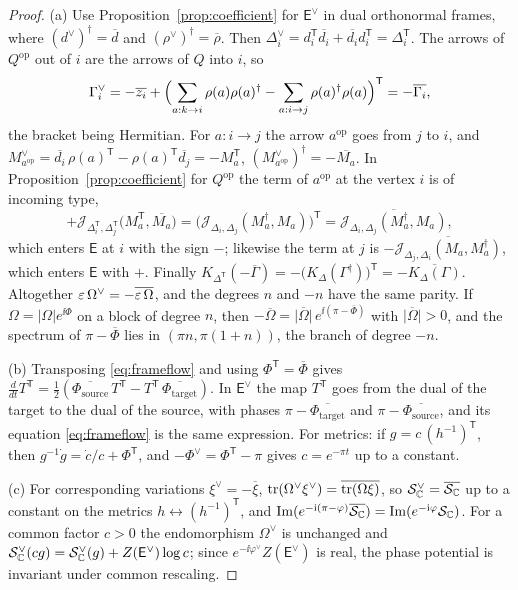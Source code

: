 \begin{proof}
(a) Use Proposition~\ref{prop:coefficient} for $\mathsf E^\vee$ in dual
orthonormal frames, where $(d^\vee)^\dagger=\overline d$ and
$(\rho^\vee)^\dagger=\overline\rho$. Then
$\Delta_i^\vee=d_i^{\mathsf T}\overline{d_i}+\overline{d_i}d_i^{\mathsf T}=\Delta_i^{\mathsf T}$. The arrows
of $Q^{\mathrm{op}}$ out of $i$ are the arrows of $Q$ into $i$, so
\[
 \Gamma_i^\vee=-\overline{z_i}+\Bigl(\sum_{a:k\to i}\rho(a)\rho(a)^\dagger
 -\sum_{a:i\to j}\rho(a)^\dagger\rho(a)\Bigr)^{\mathsf T}=-\overline{\Gamma_i},
\]
the bracket being Hermitian. For $a:i\to j$ the arrow $a^{\mathrm{op}}$ goes
from $j$ to $i$, and
$M^\vee_{a^{\mathrm{op}}}=\overline{d_i}\,\rho(a)^{\mathsf T}-\rho(a)^{\mathsf T}\overline{d_j}=-M_a^{\mathsf T}$,
$(M^\vee_{a^{\mathrm{op}}})^\dagger=-\overline{M_a}$. In
Proposition~\ref{prop:coefficient} for $Q^{\mathrm{op}}$ the term of
$a^{\mathrm{op}}$ at the vertex $i$ is of incoming type,
\[
 +\mathcal J_{\Delta_i^{\mathsf T},\Delta_j^{\mathsf T}}\bigl(M_a^{\mathsf T},\overline{M_a}\bigr)
 =\bigl(\mathcal J_{\Delta_i,\Delta_j}(M_a^\dagger,M_a)\bigr)^{\mathsf T}
 =\overline{\mathcal J_{\Delta_i,\Delta_j}(M_a^\dagger,M_a)},
\]
which enters $\mathsf E$ at $i$ with the sign $-$; likewise the term at $j$
is $-\overline{\mathcal J_{\Delta_j,\Delta_i}(M_a,M_a^\dagger)}$, which
enters $\mathsf E$ with $+$. Finally
$K_{\Delta^{\mathsf T}}(-\overline\Gamma)=-\bigl(K_\Delta(\Gamma^\dagger)\bigr)^{\mathsf T}
=-\overline{K_\Delta(\Gamma)}$. Altogether
$\varepsilon\,\Omega^\vee=-\overline{\varepsilon\,\Omega}$, and the degrees $n$
and $-n$ have the same parity. If $\Omega=|\Omega|e^{\ii\Phi}$ on a block of
degree $n$, then
$-\overline\Omega=\overline{|\Omega|}\,e^{\ii(\pi-\overline\Phi)}$ with
$\overline{|\Omega|}>0$, and the spectrum of $\pi-\overline\Phi$ lies in
$(\pi n,\pi(1+n))$, the branch of degree $-n$.

(b) Transposing \eqref{eq:frameflow} and using $\Phi^{\mathsf T}=\overline\Phi$ gives
$\frac d{dt}T^{\mathsf T}=\frac12(\overline{\Phi_{\mathrm{source}}}\,T^{\mathsf T}-T^{\mathsf T}\,\overline{\Phi_{\mathrm{target}}})$.
In $\mathsf E^\vee$ the map $T^{\mathsf T}$ goes from the dual of the target to the dual
of the source, with phases $\pi-\overline{\Phi_{\mathrm{target}}}$ and
$\pi-\overline{\Phi_{\mathrm{source}}}$, and its equation
\eqref{eq:frameflow} is the same expression. For metrics: if
$g=c\,(h^{-1})^{\mathsf T}$, then $g^{-1}\dot g=\dot c/c+\Phi^{\mathsf T}$, and
$-\Phi^\vee=\Phi^{\mathsf T}-\pi$ gives $c=e^{-\pi t}$ up to a constant.

(c) For corresponding variations $\xi^\vee=-\overline\xi$,
$\operatorname{tr}(\Omega^\vee\xi^\vee)=\overline{\operatorname{tr}(\Omega\xi)}$, so
$\mathcal S^\vee_{\mathbb C}=\overline{\mathcal S_{\mathbb C}}$ up to a constant on the metrics
$h\leftrightarrow(h^{-1})^{\mathsf T}$, and
$\operatorname{Im}(e^{-\mathrm i(\pi-\varphi)}\overline{\mathcal S_{\mathbb C}})=\operatorname{Im}(e^{-\mathrm i\varphi}\mathcal S_{\mathbb C})$.
For a common factor $c>0$ the endomorphism $\Omega^\vee$ is unchanged and
$\mathcal S^\vee_{\mathbb C}(cg)=\mathcal S^\vee_{\mathbb C}(g)+Z(\mathsf E^\vee)\log c$; since
$e^{-\ii\varphi^\vee}Z(\mathsf E^\vee)$ is real, the phase potential is
invariant under common rescaling.
\end{proof}

